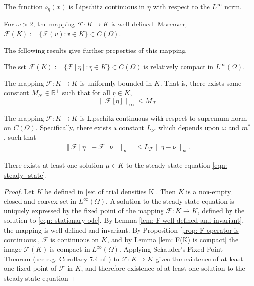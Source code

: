 \documentclass[10pt]{article}
\begin{document}
\begin{lemma}\label{lem: b is Lipschitz L_infty}
    The function $b_{\eta}(x)$ is Lipschitz continuous in $\eta$ with respect to the $L^\infty$ norm. 
\end{lemma}
\begin{lemma}\label{lem: F well defined and invariant}
    For $\omega>2$, the mapping $\mathcal{F}:K \rightarrow K$ is well defined. Moreover, $\mathcal{F}(K):=\{\mathcal{F}(v): v \in K\} \subset C(\Omega)$. 
\end{lemma}

The following results give further properties of this mapping.
\begin{lemma}\label{lem: F(K) is compact}
    The set $\mathcal{F}(K):=\{\mathcal{F}[\eta]: \eta \in K\} \subset C(\Omega)$ is relatively compact in $L^\infty(\Omega)$. 
\end{lemma}

\begin{proposition}\label{prop: F_bounded}
    The mapping $\mathcal{F}:K \rightarrow K$ is uniformly bounded in $K$. That is, there exists some constant $M_\mathcal{F} \in \mathbb{R^+}$ such that for all $\eta \in K$, \begin{equation*}
        \|\mathcal{F}[\eta]\|_{\infty}\leq M_\mathcal{F}
    \end{equation*} 
\end{proposition}


\begin{proposition}\label{prop: F operator is continuous}
    The mapping $\mathcal{F}:K \rightarrow K$ is Lipschitz continuous with respect to supremum norm on $C(\Omega)$. Specifically, there exists a constant $L_\mathcal{F}$ which depends upon $\omega$ and $m^*$, such that
    \begin{align*}
        \|\mathcal{F}[\eta]-\mathcal{F}[\nu]\|_\infty &\leq L_\mathcal{F}\|\eta-\nu\|_\infty.
    \end{align*}
\end{proposition}

\begin{theorem}
    There exists at least one solution $\mu \in K$ to the steady state equation \eqref{eqn: steady_state}. 
\end{theorem}
\begin{proof}
    Let $K$ be defined in \eqref{set of trial densities K}. Then $K$ is a non-empty, closed and convex set in $L^\infty(\Omega)$. A solution to the steady state equation is uniquely expressed by the fixed point of the mapping $\mathcal{F}:K\rightarrow K$, defined by the solution to \eqref{eqn: stationary ode}. By Lemma \ref{lem: F well defined and invariant}, the mapping is well defined and invariant. By Proposition \ref{prop: F operator is continuous}, $\mathcal{F}$ is continuous on $K$, and by Lemma \ref{lem: F(K) is compact} the image $\mathcal{F}(K)$ is compact in $L^\infty(\Omega)$. Applying Schauder's Fixed Point Theorem (see e.g. Corollary 7.4 of \cite{shapiro_fixed_point}) to $\mathcal{F}:K\rightarrow K$ gives the existence of at least one fixed point of $\mathcal{F}$ in $K$, and therefore existence of at least one solution to the steady state equation.
\end{proof}
\end{document}
